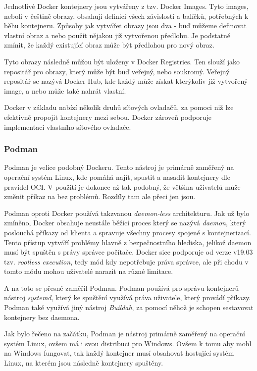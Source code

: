 Jednotlivé Docker kontejnery jsou vytvářeny z tzv. Docker Images. Tyto images, neboli v češtině obrazy, obsahují definici všech závislostí a balíčků, potřebných k běhu kontejneru. Způsoby jak vytvářet obrazy jsou dva - buď můžeme definovat vlastní obraz a nebo použít nějakou již vytvořenou předlohu. Je podstatné zmínit, že každý existující obraz může být předlohou pro nový obraz. 

Tyto obrazy následně můžou být uloženy v Docker Registries. Ten slouží jako repositář pro obrazy, který může být buď veřejný, nebo soukromý. Veřejný repositář se nazývá Docker Hub\cite{docker_hub}, kde každý může získat kterýkoliv již vytvořený image, a nebo může také nahrát vlastní. \cite{turnbull2014docker} 

Docker v základu nabízí několik druhů síťových ovladačů, za pomoci niž lze efektivně propojit kontejnery mezi sebou. Docker zároveň podporuje implementaci vlastního síťového ovladače. \cite{docker_networking_overview}


\subsubsection{Podman}
Podman je velice podobný Dockeru. Tento nástroj je primárně zaměřený na operační systém Linux, kde pomáhá najít, spustit a nasadit kontejnery dle pravidel OCI. V použití je dokonce až tak podobný, že většina uživatelů může změnit příkaz  na  bez problémů. Rozdíly tam ale přeci jen jsou. 

Podman oproti Docker používá takzvanou \textit{daemon-less} architekturu. Jak už bylo zmíněno, Docker obsahuje neustále běžící proces který se nazývá \textit{daemon}, který poslouchá příkazy od klienta a spravuje všechny procesy spojené s kontejnerizací. Tento přístup vytváří problémy hlavně z bezpečnostního hlediska, jelikož daemon musí být spuštěn s právy správce počítače. Docker sice podporuje od verze v19.03 tzv. \textit{rootless execution}, tedy mód kdy nepotřebuje práva správce, ale při chodu v tomto módu mohou uživatelé narazit na různé limitace.

A na toto se přesně zaměřil Podman. Podman používá pro správu kontejnerů nástroj \textit{systemd}, který ke spuštění využívá práva uživatele, který provádí příkazy. Podman také využívá jiný nástroj \textit{Buildah}, za pomocí něhož je schopen sestavovat kontejnery bez daemona. 

Jak bylo řečeno na začátku, Podman je nástroj primárně zaměřený na operační systém Linux, ovšem má i svou distribuci pro Windows. Ovšem k tomu aby mohl na Windows fungovat, tak každý kontejner musí obsahovat hostující systém Linux, na kterém jsou následně kontejnery spuštěny. \cite{podman}\cite{podman_vs_docker}